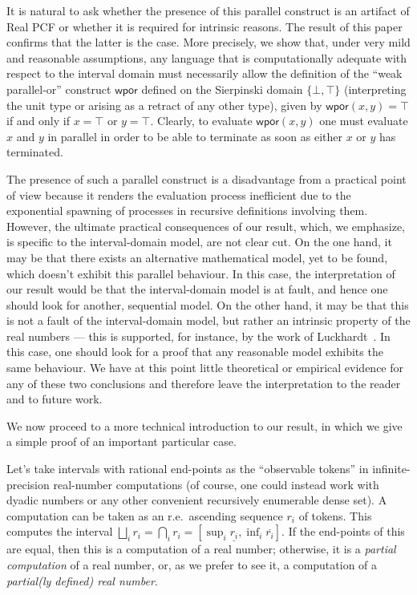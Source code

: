 \documentclass[12pt]{article}
\begin{document}
It is natural to ask whether the presence of this parallel construct
is an artifact of Real PCF or whether it is required for intrinsic
reasons. The result of this paper confirms that the latter is the
case.  More precisely, we show that, under very mild and reasonable
assumptions, any language that is computationally adequate with
respect to the interval domain must necessarily allow the definition
of the ``weak parallel-or'' construct $\textsf{wpor}$ defined on the
Sierpinski domain $\{ \bot, \top \}$ (interpreting the unit
type or arising as a retract of any other type), given by
$\textsf{wpor}(x,y)=\top$ if and only if $x=\top$ or $y=\top$.
Clearly, to evaluate $\textsf{wpor}(x,y)$ one must evaluate $x$ and
$y$ in parallel in order to be able to terminate as soon as either $x$
or $y$ has terminated.

The presence of such a parallel construct is a disadvantage from a
practical point of view because it renders the evaluation process
inefficient due to the exponential spawning of processes in recursive
definitions involving them.  However, the ultimate practical
consequences of our result, which, we emphasize, is specific to the
interval-domain model, are not clear cut. On the one hand, it may be
that there exists an alternative mathematical model, yet to be found,
which doesn't exhibit this parallel behaviour.  In this case, the
interpretation of our result would be that the interval-domain model
is at fault, and hence one should look for another, sequential model.
On the other hand, it may be that this is
not a fault of the interval-domain model, but rather an intrinsic
property of the real numbers --- this is supported, for instance, by
the work of Luckhardt~\cite{luckhardt}.  In this case, one should look
for a proof that any reasonable model exhibits the same behaviour.  We
have at this point little theoretical or empirical evidence for any of
these two conclusions and therefore leave the interpretation to the
reader and to future work.

We now proceed to a more technical introduction to our result, in
which we give a simple proof of an important particular case.

Let's take intervals with rational end-points as the ``observable
tokens'' in infinite-precision real-number computations (of course,
one could instead work with dyadic numbers or any other convenient
recursively enumerable dense set).  A computation can be taken as an
r.e.\ ascending sequence $r_i$ of tokens. This computes the interval
$\bigsqcup_i r_i = \bigcap_i r_i = [\sup_i \underline{r_i}, \inf_i
\overline{r_i}]$. If the end-points of this are equal, then this is a
computation of a real number; otherwise, it is a \emph{partial
  computation} of a real number, or, as we prefer to see it, a
computation of a \emph{partial(ly defined) real number}.
\end{document}
